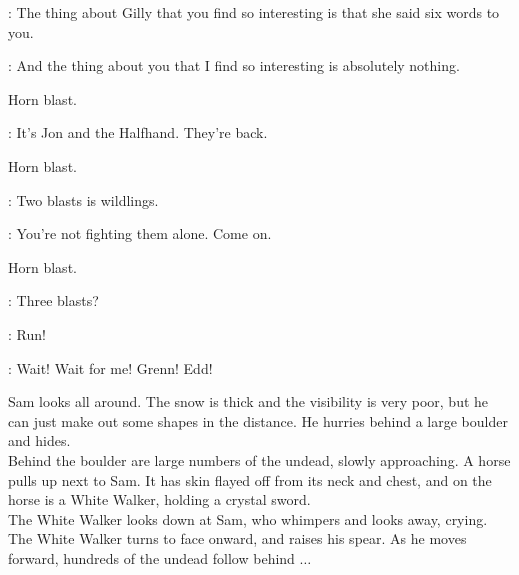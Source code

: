\EDD: The thing about Gilly that you find so interesting is that she said six words to you. 

\SAM:  And the thing about you that I find so interesting is absolutely nothing. 

\sfx Horn blast.

\SAM: It's Jon and the Halfhand. They're back.

\sfx Horn blast.

\GRENN:  Two blasts is wildlings. 

\EDD: You're not fighting them alone. Come on. 

\sfx Horn blast.


\GRENN: Three blasts? 

\EDD:  Run! 


\SAM:  Wait! Wait for me!  Grenn! Edd! 


\n Sam looks all around. The snow is thick and the visibility is very poor, but he can just make out some shapes in the distance. He hurries behind a large boulder and hides.\\
Behind the boulder are large numbers of the undead, slowly approaching. A horse pulls up next to Sam. It has skin flayed off from its neck and chest, and on the horse is a White Walker, holding a crystal sword.\\
The White Walker looks down at Sam, who whimpers and looks away, crying. The White Walker turns to face onward, and raises his spear. As he moves forward, hundreds of the undead follow behind $\ldots$


